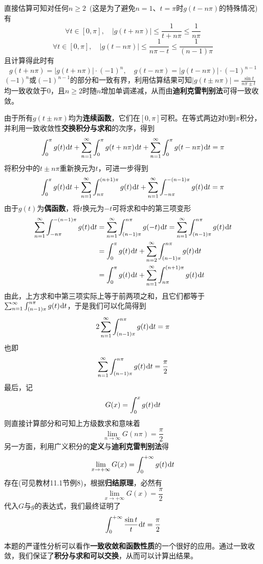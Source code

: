 \documentclass[a4paper,UTF8,fontset=windows,AutoFakeBold]{ctexart}
\newcommand*{\dr}{\hspace{0.07em}\mathrm{d}}
\newcommand*{\suminf}[1][n=1]{\sum_{#1}^\infty}
\newcommand*{\note}{\noindent *}
\theoremstyle{ex}
\begin{document}
\begin{framed}
{\begin{itemize}
        直接估算可知对任何$n\ge2$\ (这是为了避免$n=1$、$t=\pi$时$g(t-n\pi)$的特殊情况)有
        $$\forall t\in[0,\pi],\quad|g(t+n\pi)|\le\frac{1}{t+n\pi}\le\frac{1}{n\pi}$$
        $$\forall t\in[0,\pi],\quad|g(t-n\pi)|\le\frac{1}{n\pi-t}\le\frac{1}{(n-1)\pi}$$
        且计算得此时有
        $$g(t+n\pi)=|g(t+n\pi)|\cdot(-1)^n,\quad g(t-n\pi)=|g(t-n\pi)|\cdot(-1)^{n-1}$$
        $(-1)^n$或$(-1)^{n-1}$的部分和一致有界，利用估算结果可知$|g(t\pm n\pi)|=\frac{\sin t}{n\pi\pm t}$均一致收敛于0，且$n\ge2$时随$n$增加单调递减，从而由\textbf{迪利克雷判别法}可得一致收敛。

        由于所有$g(t\pm n\pi)$均为\textbf{连续函数}，它们在$[0,\pi]$可积。在等式两边对0到$\pi$积分，并利用一致收敛性\textbf{交换积分与求和}的次序，得到
        $$\int_0^\pi g(t)\dr t+\suminf\int_0^\pi g(t+n\pi)\dr t+\suminf\int_0^\pi g(t-n\pi)\dr t=\pi$$
        将积分中的$t\pm n\pi$重新换元为$t$，可进一步得到
        $$\int_0^\pi g(t)\dr t+\suminf\int_{n\pi}^{(n+1)\pi}g(t)\dr t+\suminf\int_{-n\pi}^{-(n-1)\pi}g(t)\dr t=\pi$$
        由于$g(t)$为\textbf{偶函数}，将$t$换元为$-t$可将求和中的第三项变形
        $$\begin{aligned}\suminf\int_{-n\pi}^{-(n-1)\pi}g(t)\dr t&=\suminf\int_{(n-1)\pi}^{n\pi}g(-t)\dr t=\suminf\int_{(n-1)\pi}^{n\pi}g(t)\dr t\\ &=\int_0^\pi g(t)\dr t+\suminf[n=2]\int_{(n-1)\pi}^{n\pi}g(t)\dr t\\ &=\int_0^\pi g(t)\dr t+\suminf\int_{n\pi}^{(n+1)\pi}g(t)\dr t\end{aligned}$$
        由此，上方求和中第三项实际上等于前两项之和，且它们都等于$\suminf\int_{(n-1)\pi}^{n\pi}g(t)\dr t$，于是我们可以化简得到
        $$2\suminf\int_{(n-1)\pi}^{n\pi}g(t)\dr t=\pi$$
        也即
        $$\suminf\int_{(n-1)\pi}^{n\pi}g(t)\dr t=\frac{\pi}{2}$$
        最后，记
        $$G(x)=\int_0^xg(t)\dr t$$
        则直接计算部分和可知上方级数求和意味着
        $$\lim_{n\to\infty}G(n\pi)=\frac{\pi}{2}$$
        另一方面，利用广义积分的\textbf{定义}与\textbf{迪利克雷判别法}得
        $$\lim_{x\to+\infty}G(x)=\int_0^{+\infty}g(t)\dr t$$
        存在(可见教材11.1节例8)，根据\textbf{归结原理}，必然有
        $$\lim_{x\to+\infty}G(x)=\frac{\pi}{2}$$
        代入$G$与$g$的表达式，我们最终证明了
        $$\int_0^{+\infty}\frac{\sin t}{t}\dr t=\frac{\pi}{2}$$
    \end{itemize}
}
\end{framed}

\note 本题的严谨性分析可以看作\textbf{一致收敛和函数性质}的一个很好的应用。通过一致收敛，我们保证了\textbf{积分与求和可以交换}，从而可以计算出结果。
\end{document}
